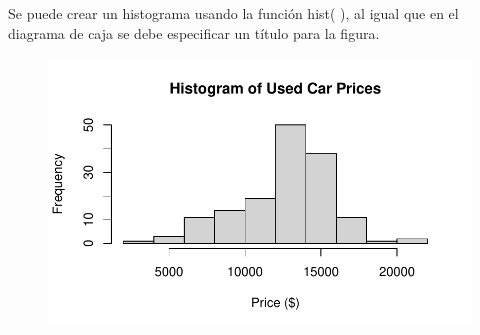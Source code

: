 \documentclass[
  letterpaper,
  DIV=11,
  numbers=noendperiod]{scrartcl}
\newenvironment{Shaded}{\begin{snugshade}}{\end{snugshade}}
\newcommand{\AttributeTok}[1]{\textcolor[rgb]{0.40,0.45,0.13}{#1}}
\newcommand{\FunctionTok}[1]{\textcolor[rgb]{0.28,0.35,0.67}{#1}}
\newcommand{\NormalTok}[1]{\textcolor[rgb]{0.00,0.23,0.31}{#1}}
\newcommand{\SpecialCharTok}[1]{\textcolor[rgb]{0.37,0.37,0.37}{#1}}
\newcommand{\StringTok}[1]{\textcolor[rgb]{0.13,0.47,0.30}{#1}}
\begin{document}
Se puede crear un histograma usando la función hist( ), al igual que en
el diagrama de caja se debe especificar un título para la figura.

\begin{Shaded}
\end{Shaded}

\begin{figure}[H]

{\centering \includegraphics{Unidad1-resumen_files/figure-pdf/unnamed-chunk-55-1.pdf}

}

\end{figure}

\begin{Shaded}
\end{Shaded}
\end{document}
